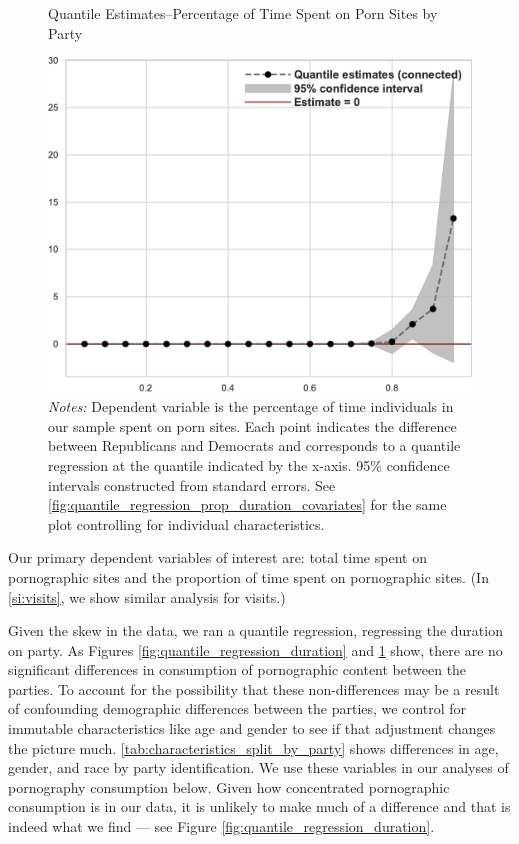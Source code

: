 \documentclass[12pt, letterpaper]{article}
\begin{document}
\begin{figure}[t]
	\centering
	\caption{Quantile Estimates--Percentage of Time Spent on Porn Sites by Party}
	\includegraphics[width=.7\linewidth]{../figs/quantile_reg_proportion_duration_adult.pdf}
	\caption*{\footnotesize \emph{Notes:} 
		Dependent variable is the percentage of time individuals in our sample spent on porn sites.
		Each point indicates the difference between Republicans and Democrats and corresponds to a quantile regression at the quantile indicated by the x-axis.
		95\% confidence intervals constructed from standard errors.
		See \cref{fig:quantile_regression_prop_duration_covariates} for the same plot controlling for individual characteristics.
	}
	\label{fig:quantile_regression_prop_duration}
\end{figure}

Our primary dependent variables of interest are: total time spent on pornographic sites and the proportion of time spent on pornographic sites. (In \ref{si:visits}, we show similar analysis for visits.)

Given the skew in the data, we ran a quantile regression, regressing the duration on party. As Figures \ref{fig:quantile_regression_duration} and \ref{fig:quantile_regression_prop_duration} show, there are no significant differences in consumption of pornographic content between the parties. To account for the possibility that these non-differences may be a result of confounding demographic differences between the parties, we control for immutable characteristics like age and gender to see if that adjustment changes the picture much. \cref{tab:characteristics_split_by_party} shows differences in age, gender, and race by party identification. We use these variables in our analyses of pornography consumption below. Given how concentrated pornographic consumption is in our data, it is unlikely to make much of a difference and that is indeed what we find --- see Figure \ref{fig:quantile_regression_duration}. 
\end{document}
